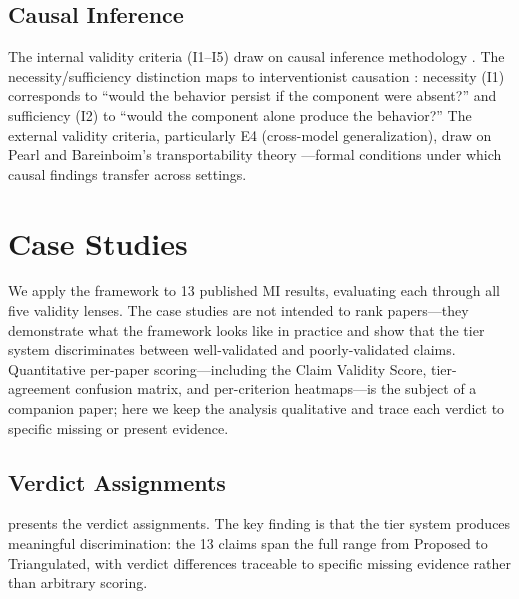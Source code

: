 \documentclass[10pt]{article}
\begin{document}
\subsection{Causal Inference}
\label{sec:causal}

The internal validity criteria (I1--I5) draw on causal inference methodology \citep{pearl2009causality, spirtes2000causation}. The necessity/sufficiency distinction maps to interventionist causation \citep{woodward2003making}: necessity (I1) corresponds to ``would the behavior persist if the component were absent?'' and sufficiency (I2) to ``would the component alone produce the behavior?'' The external validity criteria, particularly E4 (cross-model generalization), draw on Pearl and Bareinboim's transportability theory \citep{pearl2011transportability}---formal conditions under which causal findings transfer across settings.

\section{Case Studies}
\label{sec:case-studies}

We apply the framework to 13 published MI results, evaluating each through all five validity lenses. The case studies are not intended to rank papers---they demonstrate what the framework looks like in practice and show that the tier system discriminates between well-validated and poorly-validated claims. Quantitative per-paper scoring---including the Claim Validity Score, tier-agreement confusion matrix, and per-criterion heatmaps---is the subject of a companion paper; here we keep the analysis qualitative and trace each verdict to specific missing or present evidence.

\subsection{Verdict Assignments}

 presents the verdict assignments. The key finding is that the tier system produces meaningful discrimination: the 13 claims span the full range from Proposed to Triangulated, with verdict differences traceable to specific missing evidence rather than arbitrary scoring.
\end{document}
